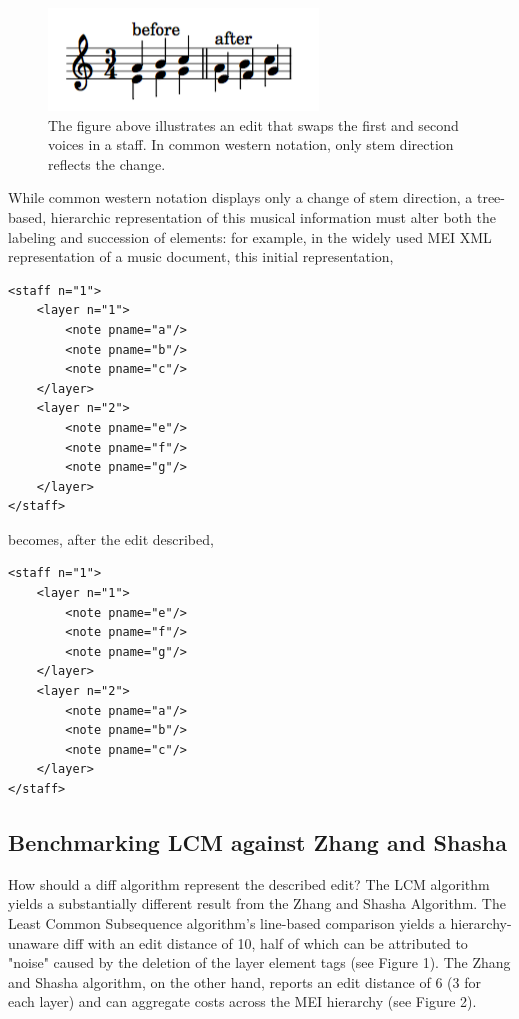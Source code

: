 \documentclass{article}
\begin{document}
\begin{figure}[!htb]
\centering
\includegraphics[width=0.8\columnwidth]{layers.png}
\caption{The figure above illustrates an edit that swaps the first and second voices in a staff. In common western notation, only stem direction reflects the change.}
\label{fig:example}
\end{figure}

While common western notation displays only a change of stem direction, a tree-based, hierarchic representation of this musical information must alter both the labeling and succession of elements: for example, in the widely used MEI XML representation of a music document, this initial representation,

\break

\begin{verbatim}
<staff n="1"> 
    <layer n="1">
        <note pname="a"/>
        <note pname="b"/>
        <note pname="c"/>
    </layer>
    <layer n="2">
        <note pname="e"/>
        <note pname="f"/>
        <note pname="g"/>
    </layer>
</staff>
\end{verbatim}

\noindent becomes, after the edit described,

\begin{verbatim}
<staff n="1">
    <layer n="1">
        <note pname="e"/>
        <note pname="f"/>
        <note pname="g"/>
    </layer>
    <layer n="2">
        <note pname="a"/>
        <note pname="b"/>
        <note pname="c"/>
    </layer>
</staff>
\end{verbatim}

\subsection{Benchmarking LCM against Zhang and Shasha}
How should a diff algorithm represent the described edit? The LCM algorithm yields a substantially different result from the Zhang and Shasha Algorithm. The Least Common Subsequence algorithm's line-based comparison yields a hierarchy-unaware diff with an edit distance of 10, half of which can be attributed to "noise" caused by the deletion of the layer element tags (see Figure 1). The Zhang and Shasha algorithm, on the other hand, reports an edit distance of 6 (3 for each layer) and can aggregate costs across the MEI hierarchy (see Figure 2).
\end{document}
